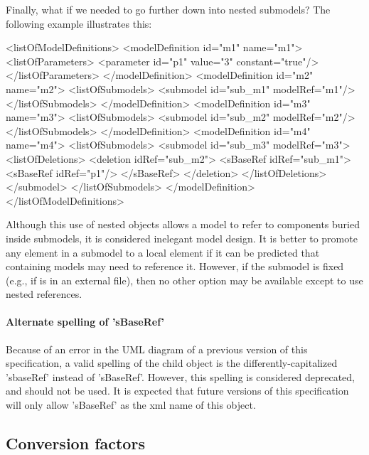 Finally, what if we needed to go further down into nested submodels?
The following example illustrates this:

\begin{example}
<listOfModelDefinitions> 
  <modelDefinition id="m1" name="m1">
    <listOfParameters>
      <parameter id="p1" value="3" constant="true"/>
    </listOfParameters>
  </modelDefinition>
  <modelDefinition id="m2" name="m2">
    <listOfSubmodels>
      <submodel id="sub_m1" modelRef="m1"/>
    </listOfSubmodels>
  </modelDefinition>
  <modelDefinition id="m3" name="m3">
    <listOfSubmodels>
      <submodel id="sub_m2" modelRef="m2"/>
    </listOfSubmodels>
  </modelDefinition>
  <modelDefinition id="m4" name="m4">
    <listOfSubmodels>
      <submodel id="sub_m3" modelRef="m3">
        <listOfDeletions>
          <deletion idRef="sub_m2">
            <sBaseRef idRef="sub_m1">
              <sBaseRef idRef="p1"/>
            </sBaseRef>
          </deletion>
        </listOfDeletions>
      </submodel>
    </listOfSubmodels>
  </modelDefinition>
</listOfModelDefinitions> 
\end{example}


Although this use of nested \SBaseRef objects allows a model to refer to
components buried inside submodels, it is considered inelegant model
design.  It is better to promote any element in a submodel to a local
element if it can be predicted that containing models may need to
reference it.  However, if the submodel is fixed (e.g., if is in an
external file), then no other option may be available except to use
nested references.

\begin{blockChanged}
\paragraph{Alternate spelling of 'sBaseRef'}
\label{sbaseref-deprecated-spelling}
Because of an error in the UML diagram of a previous version of this specification, a valid spelling of the child \SBaseRef object is the differently-capitalized 'sbaseRef' instead of 'sBaseRef'.  However, this spelling is considered deprecated, and should not be used.  It is expected that future versions of this specification will only allow 'sBaseRef' as the xml name of this object.
\end{blockChanged}



\subsection{Conversion factors}
\label{conversion-factors}

